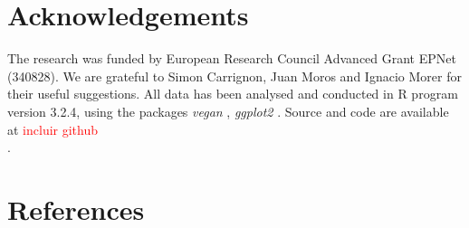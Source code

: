 \documentclass[review]{elsarticle}
\newcommand{\memo}[2]{\textcolor{#1}{#2}}
\newcommand{\maria}[1]{\memo{red}{#1\\}}
\begin{document}
\section{Acknowledgements}

The research was funded by European Research Council Advanced Grant EPNet (340828). We are grateful to Simon Carrignon, Juan Moros and Ignacio Morer for their useful suggestions.  
All data has been analysed and conducted in R program version 3.2.4, using the packages \textit{vegan} \citep{oksanen_vegan_2007}, \textit{ggplot2} \citep{ggplot2:_2016}. Source and code are available at \maria{incluir github}. 


\section{References}

%

\end{document}
